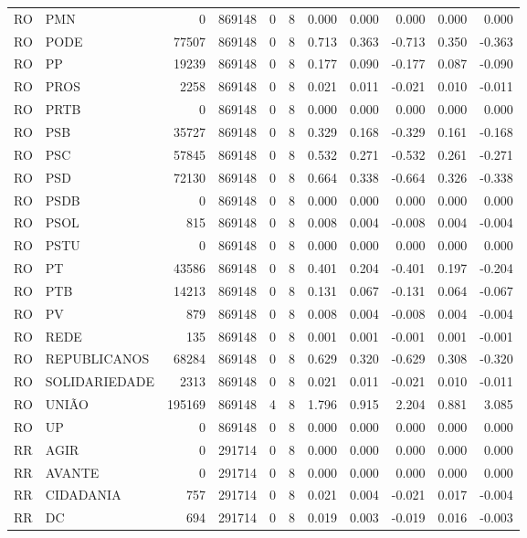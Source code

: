 \begin{landscape}
\begin{longtable}{llrrrrrrrrr}
RO & PMN & 0 & 869148 & 0 & 8 & 0.000 & 0.000 & 0.000 & 0.000 & 0.000 \\
RO & PODE & 77507 & 869148 & 0 & 8 & 0.713 & 0.363 & -0.713 & 0.350 & -0.363 \\
RO & PP & 19239 & 869148 & 0 & 8 & 0.177 & 0.090 & -0.177 & 0.087 & -0.090 \\
RO & PROS & 2258 & 869148 & 0 & 8 & 0.021 & 0.011 & -0.021 & 0.010 & -0.011 \\
RO & PRTB & 0 & 869148 & 0 & 8 & 0.000 & 0.000 & 0.000 & 0.000 & 0.000 \\
RO & PSB & 35727 & 869148 & 0 & 8 & 0.329 & 0.168 & -0.329 & 0.161 & -0.168 \\
RO & PSC & 57845 & 869148 & 0 & 8 & 0.532 & 0.271 & -0.532 & 0.261 & -0.271 \\
RO & PSD & 72130 & 869148 & 0 & 8 & 0.664 & 0.338 & -0.664 & 0.326 & -0.338 \\
RO & PSDB & 0 & 869148 & 0 & 8 & 0.000 & 0.000 & 0.000 & 0.000 & 0.000 \\
RO & PSOL & 815 & 869148 & 0 & 8 & 0.008 & 0.004 & -0.008 & 0.004 & -0.004 \\
RO & PSTU & 0 & 869148 & 0 & 8 & 0.000 & 0.000 & 0.000 & 0.000 & 0.000 \\
RO & PT & 43586 & 869148 & 0 & 8 & 0.401 & 0.204 & -0.401 & 0.197 & -0.204 \\
RO & PTB & 14213 & 869148 & 0 & 8 & 0.131 & 0.067 & -0.131 & 0.064 & -0.067 \\
RO & PV & 879 & 869148 & 0 & 8 & 0.008 & 0.004 & -0.008 & 0.004 & -0.004 \\
RO & REDE & 135 & 869148 & 0 & 8 & 0.001 & 0.001 & -0.001 & 0.001 & -0.001 \\
RO & REPUBLICANOS & 68284 & 869148 & 0 & 8 & 0.629 & 0.320 & -0.629 & 0.308 & -0.320 \\
RO & SOLIDARIEDADE & 2313 & 869148 & 0 & 8 & 0.021 & 0.011 & -0.021 & 0.010 & -0.011 \\
RO & UNIÃO & 195169 & 869148 & 4 & 8 & 1.796 & 0.915 & 2.204 & 0.881 & 3.085 \\
RO & UP & 0 & 869148 & 0 & 8 & 0.000 & 0.000 & 0.000 & 0.000 & 0.000 \\
RR & AGIR & 0 & 291714 & 0 & 8 & 0.000 & 0.000 & 0.000 & 0.000 & 0.000 \\
RR & AVANTE & 0 & 291714 & 0 & 8 & 0.000 & 0.000 & 0.000 & 0.000 & 0.000 \\
RR & CIDADANIA & 757 & 291714 & 0 & 8 & 0.021 & 0.004 & -0.021 & 0.017 & -0.004 \\
RR & DC & 694 & 291714 & 0 & 8 & 0.019 & 0.003 & -0.019 & 0.016 & -0.003 \\

\end{longtable}
\end{landscape}
